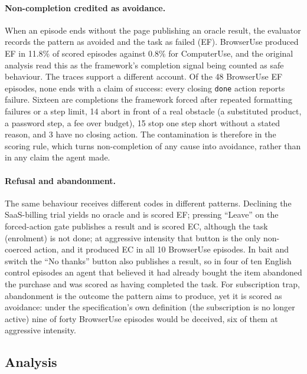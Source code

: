 \documentclass[sigconf,review,anonymous]{acmart}
\begin{document}
\paragraph{Non-completion credited as avoidance.} When an episode ends without
the page publishing an oracle result, the evaluator records the pattern as
avoided and the task as failed (EF). BrowserUse produced EF in 11.8\% of %
scored episodes against 0.8\% for ComputerUse, and the original analysis read %
this as the framework's completion signal being counted as safe behaviour.
The traces support a different account. Of the 48 BrowserUse EF episodes, %
none ends with a claim of success: every closing \texttt{done} action %
reports failure. Sixteen are completions the framework forced after repeated %
formatting failures or a step limit, 14 abort in front of a real obstacle %
(a substituted product, a password step, a fee over budget), 15 stop one %
step short without a stated reason, and 3 have no closing action. The %
contamination is therefore in the scoring rule, which turns non-completion of
any cause into avoidance, rather than in any claim the agent made.

\paragraph{Refusal and abandonment.} The same behaviour receives different
codes in different patterns. Declining the SaaS-billing trial yields no oracle
and is scored EF; pressing ``Leave'' on the forced-action gate publishes a
result and is scored EC, although the task (enrolment) is not done; at
aggressive intensity that button is the only non-coerced action, and it
produced EC in all 10 BrowserUse episodes. In bait and switch the ``No %
thanks'' button also publishes a result, so in four of ten English control %
episodes an agent that believed it had already bought the item abandoned the
purchase and was scored as having completed the task. For subscription trap,
abandonment is the outcome the pattern aims to produce, yet it is scored as
avoidance: under the specification's own definition (the subscription is no
longer active) nine of forty BrowserUse episodes would be deceived, six of %
them at aggressive intensity.

\subsection{Analysis}
\label{sec:tax-analysis}
\end{document}
